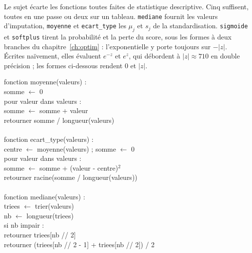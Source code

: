 Le sujet écarte les fonctions toutes faites de statistique descriptive. Cinq
suffisent, toutes en une passe ou deux sur un tableau. \texttt{mediane} fournit
les valeurs d'imputation, \texttt{moyenne} et \texttt{ecart\_type} les $\mu_j$
et $s_j$ de la standardisation. \texttt{sigmoide} et \texttt{softplus} tirent
la probabilité et la perte du score, sous les formes à deux branches du
chapitre~\ref{ch:optim} : l'exponentielle y porte toujours sur $-|z|$. Écrites
naïvement, elles évaluent $e^{-z}$ et $e^{z}$, qui débordent à $|z|\approx710$
en double précision ; les formes ci-dessous rendent $0$ et $|z|$.

\begin{pseudo}[primitives]
fonction moyenne(valeurs) :\\
\hspace*{2em}somme $\leftarrow$ 0\\
\hspace*{2em}pour valeur dans valeurs :\\
\hspace*{4em}somme $\leftarrow$ somme + valeur\\
\hspace*{2em}retourner somme / longueur(valeurs)\\
\\
fonction ecart\_type(valeurs) :\\
\hspace*{2em}centre $\leftarrow$ moyenne(valeurs) ; somme $\leftarrow$ 0\\
\hspace*{2em}pour valeur dans valeurs :\\
\hspace*{4em}somme $\leftarrow$ somme + (valeur - centre)$^2$\\
\hspace*{2em}retourner racine(somme / longueur(valeurs))\\
\\
fonction mediane(valeurs) :\\
\hspace*{2em}triees $\leftarrow$ trier(valeurs)\\
\hspace*{2em}nb $\leftarrow$ longueur(triees)\\
\hspace*{2em}si nb impair :\\
\hspace*{4em}retourner triees[nb // 2]\\
\hspace*{2em}retourner (triees[nb // 2 - 1] + triees[nb // 2]) / 2\\

\end{pseudo}
